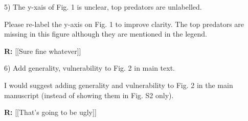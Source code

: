 \documentclass[12pt]{letter}
\newenvironment{refquote}{\bigskip \begin{it}}{\end{it}\smallskip}
\begin{document}
  5) The y-xais of Fig. 1 is unclear, top predators are unlabelled.


  \begin{refquote}

    Please re-label the y-axis on Fig. 1 to improve clarity. The top predators
    are missing in this figure although they are mentioned in the legend.

  \end{refquote}

  \textbf{R:} [[Sure fine whatever]]


  6) Add generality, vulnerability to Fig. 2 in main text.

  \begin{refquote}

    I would suggest adding generality and vulnerability to Fig. 2 in the main
    manuscript (instead of showing them in Fig. S2 only).

  \end{refquote}

  \textbf{R:} [[That's going to be ugly]]





  \newpage



\end{document}
